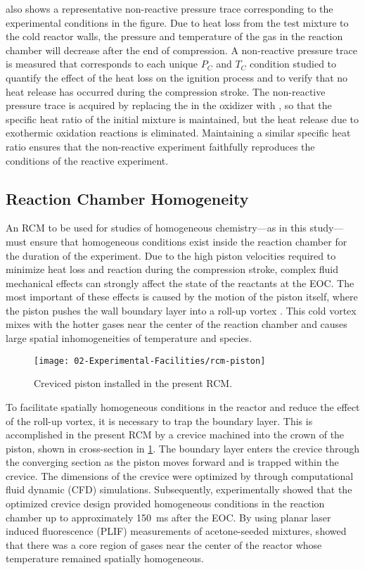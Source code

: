 \documentclass[../main.tex]{subfiles}
\begin{document}
 also shows a representative non-reactive pressure
trace corresponding to the experimental conditions in the figure.
Due to heat loss from the test mixture to the cold reactor walls,
the pressure and temperature of the gas in the reaction chamber will
decrease after the end of compression. A non-reactive pressure trace
is measured that corresponds to each unique $P_C$ and $T_C$ condition
studied to quantify the effect of the heat loss on the ignition process
and to verify that no heat release has occurred during the compression
stroke. The non-reactive pressure trace is acquired by replacing the
 in the oxidizer with , so that the specific heat ratio
of the initial mixture is maintained, but the heat release due to
exothermic oxidation reactions is eliminated. Maintaining a similar
specific heat ratio ensures that the non-reactive experiment faithfully
reproduces the conditions of the reactive experiment.


\subsection{Reaction Chamber Homogeneity}
\label{sec:rcm-homogeneity}

An RCM to be used for studies of homogeneous chemistry---as in this study---%
must ensure that homogeneous conditions exist inside the reaction
chamber for the duration of the experiment. Due to the high piston
velocities required to minimize heat loss and reaction during the
compression stroke, complex fluid mechanical effects can strongly
affect the state of the reactants at the EOC. The most important of these
effects is caused by the motion of the piston itself, where the piston
pushes the wall boundary layer into a roll-up vortex \cite{Lee1998}.
This cold vortex mixes with the hotter gases near the center of
the reaction chamber and causes large spatial inhomogeneities of
temperature and species.

\begin{figure}
    \texttt{[image: 02-Experimental-Facilities/rcm-piston]}
    \caption{Creviced piston installed in the present RCM.}
    \label{fig:rcm-piston}
\end{figure}

To facilitate spatially homogeneous conditions in the reactor
and reduce the effect of the roll-up vortex, it is necessary to trap
the boundary layer. This is accomplished in the present RCM by a
crevice machined into the crown of the piston, shown in cross-section
in \cref{fig:rcm-piston}. The boundary layer enters the crevice through
the converging section as the piston moves forward and is trapped
within the crevice. The dimensions of the crevice were optimized
by \textcite{Mittal2006a} through computational fluid dynamic (CFD)
simulations. Subsequently, \textcite{Mittal2006b} experimentally showed
that the optimized crevice design provided homogeneous conditions in the
reaction chamber up to approximately \SI{150}{\milli\second} after the
EOC. By using planar laser induced fluorescence (PLIF)
measurements of acetone-seeded mixtures, \textcite{Mittal2006b}
showed that there was a core region of gases near the center of the
reactor whose temperature remained spatially homogeneous.
\end{document}
